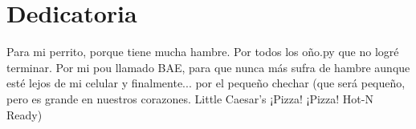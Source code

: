 \chapter*{Dedicatoria}
Para mi perrito, porque tiene mucha hambre. Por todos los oño.py que no logré terminar. Por mi pou llamado BAE, para que nunca más sufra de hambre aunque esté lejos de mi celular y finalmente... por el pequeño chechar (que será pequeño, pero es grande en nuestros corazones. Little Caesar's ¡Pizza! ¡Pizza! Hot-N Ready)